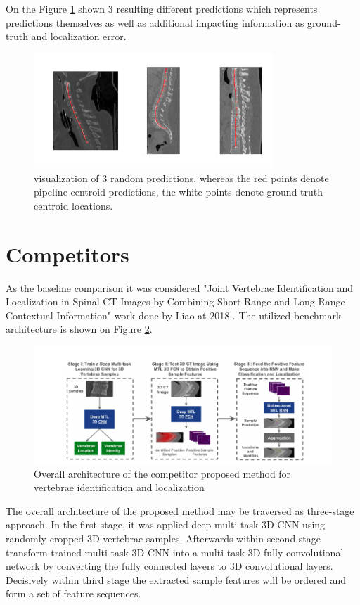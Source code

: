 On the Figure \ref{fig:predictions} shown 3 resulting different predictions which represents predictions themselves as well as additional impacting information as ground-truth and localization error. 
\begin{figure}[h]
    \centering \includegraphics[width=9cm]{images/predictions.png}
    \caption {visualization of 3 random predictions, whereas the red points denote pipeline centroid predictions, the white points denote ground-truth centroid locations.}
    \label{fig:predictions}
\end{figure}

\newpage
\section{Competitors}
As the baseline comparison it was considered "Joint Vertebrae Identification and Localization in Spinal CT Images by Combining Short-Range and Long-Range Contextual Information" work done by Liao at 2018 \cite{Liao2018}. The utilized benchmark architecture is shown on Figure \ref{fig:competitor}.

\begin{figure}[h]
    \centering \includegraphics[width=12cm]{images/competitor.png}
    \caption {Overall architecture of the competitor proposed method for vertebrae identification and localization}
    \label{fig:competitor}
\end{figure}

The overall architecture of the proposed method may be traversed as three-stage approach. In the first stage, it was applied deep multi-task 3D CNN using randomly cropped 3D vertebrae samples. Afterwards within second stage transform trained multi-task 3D CNN into a multi-task 3D fully convolutional network by converting the fully connected layers to 3D convolutional layers. Decisively within third stage the extracted sample features will be ordered and form a set of feature sequences. 

